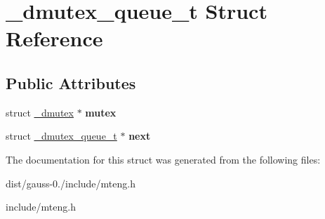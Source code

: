 \hypertarget{struct__dmutex__queue__t}{\section{\-\_\-dmutex\-\_\-queue\-\_\-t Struct Reference}
\label{struct__dmutex__queue__t}
}
\subsection*{Public Attributes}
\begin{DoxyCompactItemize}
\item 
\hypertarget{struct__dmutex__queue__t_ae903f2089ebb74f3ee8b483814efc698}{struct \hyperlink{struct__dmutex}{\-\_\-dmutex} $\ast$ {\bfseries mutex}}\label{struct__dmutex__queue__t_ae903f2089ebb74f3ee8b483814efc698}

\item 
\hypertarget{struct__dmutex__queue__t_a4cbeccbdea1929aa1c1bcf1b389502ff}{struct \hyperlink{struct__dmutex__queue__t}{\-\_\-dmutex\-\_\-queue\-\_\-t} $\ast$ {\bfseries next}}\label{struct__dmutex__queue__t_a4cbeccbdea1929aa1c1bcf1b389502ff}

\end{DoxyCompactItemize}


The documentation for this struct was generated from the following files\-:\begin{DoxyCompactItemize}
\item 
dist/gauss-\/0./include/mteng.\-h\item 
include/mteng.\-h\end{DoxyCompactItemize}
